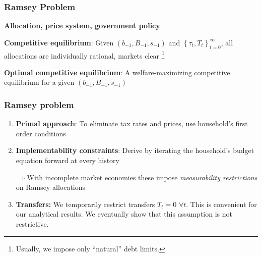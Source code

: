 \documentclass{beamer}
\begin{document}
\begin{frame}
 \frametitle{Ramsey Problem}

\begin{definition}
\textbf{Allocation, price system, government policy}

\end{definition}

\begin{definition}
\textbf{Competitive equilibrium}: Given $\left(b_{-1},B_{-1},s_{-1}\right) $ and $\left\{ \tau _{t},T_{t}\right\} _{t=0}^{\infty }$,
all allocations are individually rational, markets clear \footnote{Usually, we impose only  ``natural'' debt limits. }
\end{definition}

\begin{definition}
\textbf{Optimal competitive equilibrium}: A welfare-maximizing competitive
equilibrium for a given $\left( b_{-1},B_{-1},s_{-1}\right) $
\end{definition}

 \end{frame}

\begin{frame}
  \frametitle{Ramsey problem}

  \begin{enumerate}
  \item \textbf{Primal approach}: To eliminate tax rates and prices, use  household's first order conditions
  \item \textbf{Implementability constraints}:  Derive by iterating the household's budget equation forward  at every history

  $\Rightarrow$With incomplete market economies these impose  \emph{measurability restrictions} on Ramsey allocations

  \item  \textbf{Transfers: } We temporarily restrict transfers $T_t = 0$  $\forall t$. This is convenient for our analytical results.  We eventually show  that this assumption is not restrictive.

  \end{enumerate}


  \end{frame}
\end{document}
